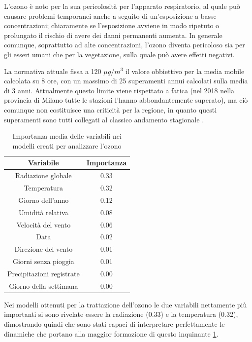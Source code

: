 \documentclass[a4paper]{report}
\begin{document}
L'ozono è noto per la sua pericolosità per l'apparato respiratorio, al quale può causare problemi temporanei anche a seguito di un'esposizione a basse concentrazioni; chiaramente se l'esposizione avviene in modo ripetuto o prolungato il rischio di avere dei danni permanenti aumenta. In generale comunque, soprattutto ad alte concentrazioni, l'ozono diventa pericoloso sia per gli esseri umani che per la vegetazione, sulla quale può avere effetti negativi.

La normativa attuale fissa a 120 $\mu g/m^3$ il valore obbiettivo per la media mobile calcolata su 8 ore, con un massimo di 25 superamenti annui calcolati sulla media di 3 anni. Attualmente questo limite viene rispettato a fatica (nel 2018 nella provincia di Milano tutte le stazioni l'hanno abbondantemente superato), ma ciò comunque non costituisce una criticità per la regione, in quanto questi superamenti sono tutti collegati al classico andamento stagionale \cite{arpa2018rapporto}.

\begin{table}[h!]
\centering
\begin{tabular}{ |c c| }
	\hline
	Variabile & Importanza \\
	\hline
	Radiazione globale & 0.33 \\
	Temperatura & 0.32 \\
	Giorno dell'anno & 0.12 \\
	Umidità relativa & 0.08 \\
	Velocità del vento & 0.06 \\
	Data & 0.02 \\
	Direzione del vento & 0.01 \\
	Giorni senza pioggia & 0.01 \\
	Precipitazioni registrate & 0.00 \\
	Giorno della settimana & 0.00 \\
	\hline
\end{tabular}
\caption{Importanza media delle variabili nei modelli creati per analizzare l'ozono}
\label{table:importanza_o3}
\end{table}

Nei modelli ottenuti per la trattazione dell'ozono le due variabili nettamente più importanti si sono rivelate essere la radiazione (0.33) e la temperatura (0.32), dimostrando quindi che sono stati capaci di interpretare perfettamente le dinamiche che portano alla maggior formazione di questo inquinante \ref{table:importanza_o3}.
\end{document}
